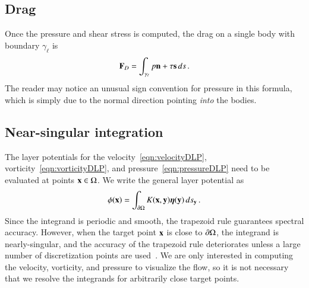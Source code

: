\documentclass[preprint, 10pt]{elsarticle}
\begin{document}
\subsection{Drag}
\label{sec:drag}
Once the pressure and shear stress is computed, the drag on a single
body with boundary $\gamma_\ell$ is
\begin{align}
\mathbf{F}_{D} = \int_{\gamma_\ell} p {\mathbf{n}} + \tau {\mathbf{s}} \,ds\, .
\label{eqn:drag}
\end{align}
The reader may notice an unusual sign convention for pressure in this formula, which is simply due to the normal direction pointing {\em into} the bodies.

\subsection{Near-singular integration}
\label{sec:NSI}
The layer potentials for the velocity~\eqref{eqn:velocityDLP},
vorticity~\eqref{eqn:vorticityDLP}, and pressure~\eqref{eqn:pressureDLP}
need to be evaluated at points ${\mathbf{x}} \in \Omega$. We write the general
layer potential as
\begin{align}
  \phi({\mathbf{x}}) = \int_{{\partial}\Omega} K({\mathbf{x}},{\mathbf{y}}) {\boldsymbol\eta}({\mathbf{y}}) \, ds_{\mathbf{y}}\, .
  \label{eqn:genericLP}
\end{align}
Since the integrand is periodic and smooth, the trapezoid rule
guarantees spectral accuracy.  However, when the target point ${\mathbf{x}}$ is
close to ${\partial}\Omega$, the integrand is nearly-singular, and the accuracy
of the trapezoid rule deteriorates unless a large number of
discretization points are used~\cite{bar2014}.  We are only interested
in computing the velocity, vorticity, and pressure to visualize the
flow, so it is not necessary that we resolve the integrands for
arbitrarily close target points.
\end{document}
